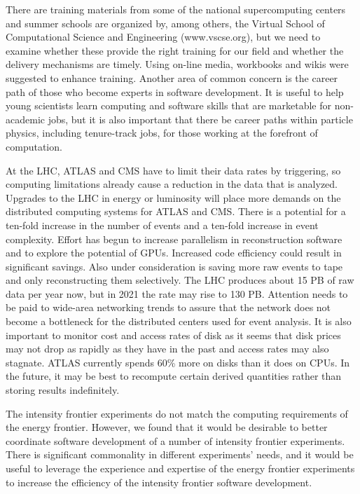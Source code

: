 There are training materials from some of the national
supercomputing centers and summer schools are organized
by, among others, the Virtual School of Computational
Science and Engineering (www.vscse.org), but we need to examine whether these
provide the right training for our field and whether the
delivery mechanisms are timely.  Using on-line media, workbooks
and wikis were suggested to enhance training.  Another area of
common concern is the career path of those who become experts in
software development.  It is useful to help young scientists learn
computing and software skills that are marketable for non-academic
jobs, but it is also important that there be career paths within particle
physics, including tenure-track jobs, for those working at the
forefront of computation.

At the LHC, ATLAS and CMS have to limit their data rates by
triggering, so computing limitations already cause a reduction in
the data that is analyzed.
Upgrades to the LHC in energy or luminosity will place more 
demands on the distributed computing systems for ATLAS and CMS.  
There is a potential for a ten-fold increase in the number of events
and a ten-fold increase in event complexity.  Effort has begun to 
increase parallelism in reconstruction software and to explore
the potential of GPUs.  Increased code efficiency could result in
significant savings.  Also under consideration is saving 
more raw events to tape and only reconstructing them selectively.
The LHC produces about 15 PB of raw data per year now, but in 2021
the rate may rise to 130 PB.  Attention needs to be paid
to wide-area networking trends to assure that the network does not
become a bottleneck for the distributed centers used for event analysis.
It is also important to monitor cost and access rates of disk as
it seems that disk prices may not drop as rapidly as they have in the
past and access rates may also stagnate.  ATLAS currently spends
60\% more on disks than it does on CPUs.  In the future, it may be
best to recompute certain derived quantities rather than storing
results indefinitely.

The intensity frontier experiments do not match the computing requirements
of the energy frontier.  However, we found that
it would be desirable to better coordinate software development of
a number of intensity frontier experiments.  There is significant commonality
in different experiments' needs, and it would be useful to leverage
the experience and expertise of the energy frontier experiments
to increase the efficiency of the intensity frontier software development.

